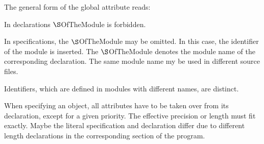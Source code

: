 The general form of the global attribute reads:

\begin{grammarframe}
\end{grammarframe}

In declarations $\S $OfTheModule is forbidden.

In specifications, the $\S $OfTheModule  may be omitted. 
In this case, the identifier of the module is inserted.
The $\S $OfTheModule denotes the module name of the corresponding
declaration.
The same module name my be used in different source files.

Identifiers, which are defined in modules with different names, are distinct.



When specifying an object, all attributes have to be taken over from its
declaration, except for a given priority. 
The effective precision or length 
must fit exactly. Maybe the literal specification and declaration differ 
due to different length declarations
 in the corresponding section of the program.

